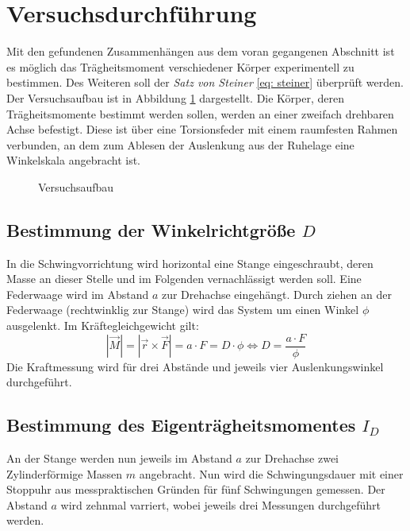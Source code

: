 \section{Versuchsdurchführung}
Mit den gefundenen Zusammenhängen aus dem voran gegangenen Abschnitt ist es
möglich das Trägheitsmoment verschiedener Körper experimentell zu bestimmen.
Des Weiteren soll der \textit{Satz von Steiner} \eqref{eq: steiner} überprüft
werden. \\
Der Versuchsaufbau ist in Abbildung \ref{fig: aufbau} dargestellt. Die Körper, deren
Trägheitsmomente bestimmt werden sollen, werden an einer zweifach drehbaren Achse
befestigt. Diese ist über eine Torsionsfeder mit einem raumfesten Rahmen verbunden,
an dem zum Ablesen der Auslenkung aus der Ruhelage eine Winkelskala angebracht ist.
\begin{figure}
  \centering
  \caption{Versuchsaufbau \cite{anleitung01}}
  \label{fig: aufbau}
\end{figure}


\subsection{Bestimmung der Winkelrichtgröße $D$}
In die Schwingvorrichtung wird horizontal eine Stange eingeschraubt, deren Masse an dieser
Stelle und im Folgenden vernachlässigt werden soll. Eine Federwaage wird im Abstand $a$ zur
Drehachse eingehängt. Durch ziehen an der Federwaage (rechtwinklig zur Stange) wird das System um einen Winkel $\phi$
ausgelenkt. Im Kräftegleichgewicht gilt:
\begin{equation}
  \left| \vec{M} \right| = \left|\vec{r} \times \vec{F} \right| = a \cdot F = D \cdot \phi \iff D = \frac{a \cdot F}{\phi}
\end{equation}
Die Kraftmessung wird für drei Abstände und jeweils vier Auslenkungswinkel durchgeführt.

\subsection{Bestimmung des Eigenträgheitsmomentes $I_D$}
An der Stange werden nun jeweils im Abstand $a$ zur Drehachse zwei Zylinderförmige
Massen $m$ angebracht. Nun wird die Schwingungsdauer mit einer Stoppuhr
aus messpraktischen Gründen für fünf Schwingungen gemessen. Der Abstand $a$ wird zehnmal varriert, wobei jeweils
drei Messungen durchgeführt werden.

